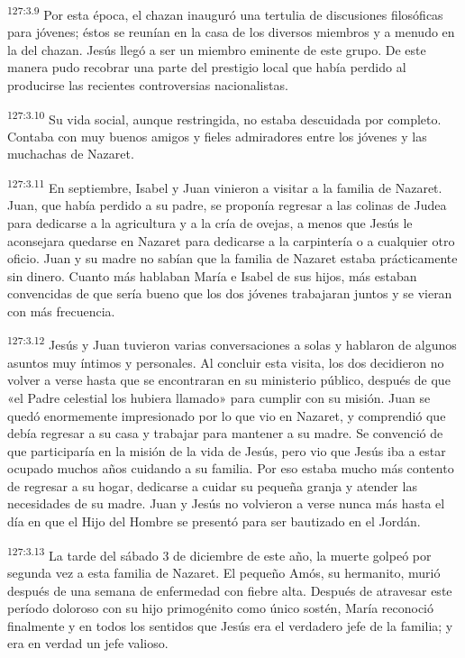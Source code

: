 \par
\textsuperscript{127:3.9} Por esta época, el chazan inauguró una tertulia de discusiones filosóficas para jóvenes; éstos se reunían en la casa de los diversos miembros y a menudo en la del chazan. Jesús llegó a ser un miembro eminente de este grupo. De este manera pudo recobrar una parte del prestigio local que había perdido al producirse las recientes controversias nacionalistas.

\par
\textsuperscript{127:3.10} Su vida social, aunque restringida, no estaba descuidada por completo. Contaba con muy buenos amigos y fieles admiradores entre los jóvenes y las muchachas de Nazaret.

\par
\textsuperscript{127:3.11} En septiembre, Isabel y Juan vinieron a visitar a la familia de Nazaret. Juan, que había perdido a su padre, se proponía regresar a las colinas de Judea para dedicarse a la agricultura y a la cría de ovejas, a menos que Jesús le aconsejara quedarse en Nazaret para dedicarse a la carpintería o a cualquier otro oficio. Juan y su madre no sabían que la familia de Nazaret estaba prácticamente sin dinero. Cuanto más hablaban María e Isabel de sus hijos, más estaban convencidas de que sería bueno que los dos jóvenes trabajaran juntos y se vieran con más frecuencia.

\par
\textsuperscript{127:3.12} Jesús y Juan tuvieron varias conversaciones a solas y hablaron de algunos asuntos muy íntimos y personales. Al concluir esta visita, los dos decidieron no volver a verse hasta que se encontraran en su ministerio público, después de que «el Padre celestial los hubiera llamado» para cumplir con su misión. Juan se quedó enormemente impresionado por lo que vio en Nazaret, y comprendió que debía regresar a su casa y trabajar para mantener a su madre. Se convenció de que participaría en la misión de la vida de Jesús, pero vio que Jesús iba a estar ocupado muchos años cuidando a su familia. Por eso estaba mucho más contento de regresar a su hogar, dedicarse a cuidar su pequeña granja y atender las necesidades de su madre. Juan y Jesús no volvieron a verse nunca más hasta el día en que el Hijo del Hombre se presentó para ser bautizado en el Jordán.

\par
\textsuperscript{127:3.13} La tarde del sábado 3 de diciembre de este año, la muerte golpeó por segunda vez a esta familia de Nazaret. El pequeño Amós, su hermanito, murió después de una semana de enfermedad con fiebre alta. Después de atravesar este período doloroso con su hijo primogénito como único sostén, María reconoció finalmente y en todos los sentidos que Jesús era el verdadero jefe de la familia; y era en verdad un jefe valioso.

